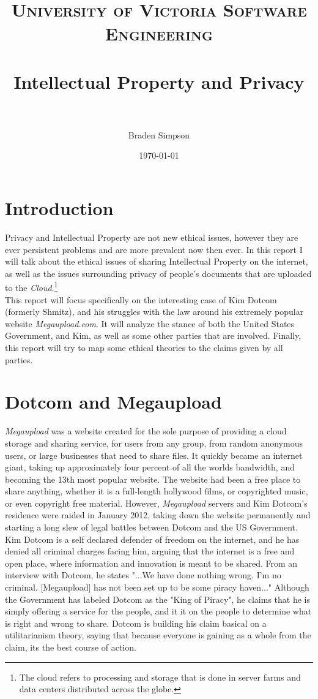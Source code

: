 \documentclass[paper=a4, fontsize=11pt]{scrartcl} %
\title{	
\normalfont \normalsize 
\textsc{University of Victoria Software Engineering} \\ [25pt] %
\horrule{0.5pt} \\[0.4cm] %
\huge Intellectual Property and Privacy \\ %
\horrule{2pt} \\[0.5cm] %
}
\author{Braden Simpson} %
\date{\normalsize\today} %
\numberwithin{equation}{section} %
\numberwithin{figure}{section} %
\numberwithin{table}{section} %
\begin{document}
\maketitle %

\section{Introduction}
Privacy and Intellectual Property are not new ethical issues, however they are ever persistent problems and are more prevalent now then ever.  In this report I will talk about the ethical issues of sharing Intellectual Property on the internet, as well as the issues surrounding privacy of people's documents that are uploaded to the \emph{Cloud}.\footnote{The cloud refers to processing and storage that is done in server farms and data centers distributed across the globe.}\\

This report will focus specifically on the interesting case of Kim Dotcom (formerly Shmitz), and his struggles with the law around his extremely popular website \emph{Megaupload.com}.  It will analyze the stance of both the United States Government, and Kim, as well as some other parties that are involved.  Finally, this report will try to map some ethical theories to the claims given by all parties.  

\section{Dotcom and Megaupload}
\emph{Megaupload} was a website created for the sole purpose of providing a cloud storage and sharing service, for users from any group, from random anonymous users, or large businesses that need to share files.  It quickly became an internet giant, taking up approximately four percent of all the worlds bandwidth, and becoming the 13th most popular website.\cite{42}  The website had been a free place to share anything, whether it is a full-length hollywood films, or copyrighted music, or even copyright free material.  However, \emph{Megaupload} servers and Kim Dotcom's residence were raided in January 2012, taking down the website permanently and starting a long slew of legal battles between Dotcom and the US Government.  \\

Kim Dotcom is a self declared defender of freedom on the internet, and he has denied all criminal charges facing him, arguing that the internet is a free and open place, where information and innovation is meant to be shared.  From an interview with Dotcom, he states "...We have done nothing wrong.  I'm no criminal.  [Megaupload] has not been set up to be some piracy haven..." \cite{43} Although the Government has labeled Dotcom as the "King of Piracy", he claims that he is simply offering a service for the people, and it it on the people to determine what is right and wrong to share.  Dotcom is building his claim basical on a utilitarianism theory, saying that because everyone is gaining as a whole from the claim, its the best course of action.  
\end{document}
